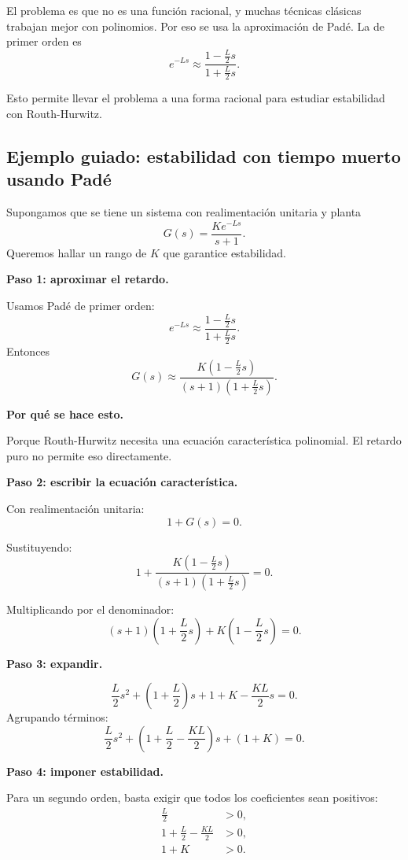 \documentclass[11pt]{article}
\begin{document}
El problema es que no es una funci\'on racional, y muchas t\'ecnicas cl\'asicas trabajan mejor con polinomios. Por eso se usa la aproximaci\'on de Pad\'e. La de primer orden es
\begin{equation}
e^{-Ls}\approx \frac{1-\frac{L}{2}s}{1+\frac{L}{2}s}.
\end{equation}

Esto permite llevar el problema a una forma racional para estudiar estabilidad con Routh-Hurwitz.

\subsection{Ejemplo guiado: estabilidad con tiempo muerto usando Pad\'e}
Supongamos que se tiene un sistema con realimentaci\'on unitaria y planta
\[
G(s)=\frac{K e^{-Ls}}{s+1}.
\]
Queremos hallar un rango de $K$ que garantice estabilidad.

\textbf{Paso 1: aproximar el retardo.}

Usamos Pad\'e de primer orden:
\[
e^{-Ls}\approx \frac{1-\frac{L}{2}s}{1+\frac{L}{2}s}.
\]
Entonces
\[
G(s)\approx \frac{K\left(1-\frac{L}{2}s\right)}{(s+1)\left(1+\frac{L}{2}s\right)}.
\]

\textbf{Por qu\'e se hace esto.}

Porque Routh-Hurwitz necesita una ecuaci\'on caracter\'istica polinomial. El retardo puro no permite eso directamente.

\textbf{Paso 2: escribir la ecuaci\'on caracter\'istica.}

Con realimentaci\'on unitaria:
\[
1+G(s)=0.
\]

Sustituyendo:
\[
1+\frac{K\left(1-\frac{L}{2}s\right)}{(s+1)\left(1+\frac{L}{2}s\right)}=0.
\]

Multiplicando por el denominador:
\[
(s+1)\left(1+\frac{L}{2}s\right)+K\left(1-\frac{L}{2}s\right)=0.
\]

\textbf{Paso 3: expandir.}

\[
\frac{L}{2}s^2+\left(1+\frac{L}{2}\right)s+1+K-\frac{KL}{2}s=0.
\]
Agrupando t\'erminos:
\begin{equation}
\frac{L}{2}s^2+\left(1+\frac{L}{2}-\frac{KL}{2}\right)s+(1+K)=0.
\end{equation}

\textbf{Paso 4: imponer estabilidad.}

Para un segundo orden, basta exigir que todos los coeficientes sean positivos:
\begin{align}
\frac{L}{2} &>0,\\
1+\frac{L}{2}-\frac{KL}{2} &>0,\\
1+K &>0.
\end{align}
\end{document}
